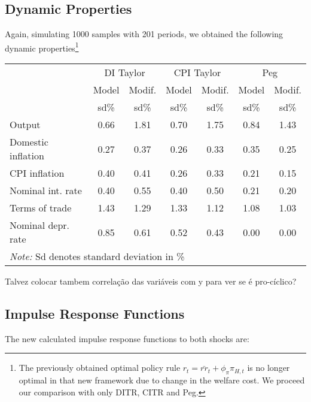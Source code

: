 \documentclass{article}
\begin{document}
\subsection{Dynamic Properties}
Again, simulating 1000 samples with 201 periods, we obtained the following dynamic properties\footnote{The previously obtained optimal policy rule 
$r_t = \bar{rr}_t + \phi_\pi \pi_{H,t}$ is no longer optimal in that new framework due to change in the welfare cost. We proceed our comparison with only DITR, CITR and Peg.}

\begin{table}[H]
    \centering
    \begin{tabular}{lcccccc}
        \hline
        & \multicolumn{2}{c}{DI Taylor} & \multicolumn{2}{c}{CPI Taylor} & \multicolumn{2}{c}{Peg}\\
        & Model & Modif.  & Model & Modif.  & Model & Modif. \\
        &  sd\% & sd\% & sd\% & sd\% & sd\% & sd\% \\
        \hline
        Output &  0.66 & 1.81 & 0.70 & 1.75 & 0.84 & 1.43 \\
        Domestic inflation & 0.27 & 0.37 & 0.26 & 0.33 & 0.35 & 0.25 \\
        CPI inflation & 0.40 & 0.41 & 0.26 & 0.33 & 0.21 & 0.15 \\
        Nominal int. rate & 0.40 & 0.55 & 0.40 & 0.50 & 0.21 & 0.20 \\
        Terms of trade & 1.43 & 1.29 & 1.33 & 1.12 & 1.08 & 1.03 \\
        Nominal depr. rate & 0.85 & 0.61 & 0.52 & 0.43 & 0.00 & 0.00 \\
        \hline
        \multicolumn{5}{l}{\textit{Note: } Sd denotes standard deviation in \%}
    \end{tabular}
\end{table}

Talvez colocar tambem correlação das variáveis com y para ver se é pro-cíclico?

\subsection{Impulse Response Functions}
The new calculated impulse response functions to both shocks are:

\begin{figure}[H]
\centering

\end{figure}
\end{document}
